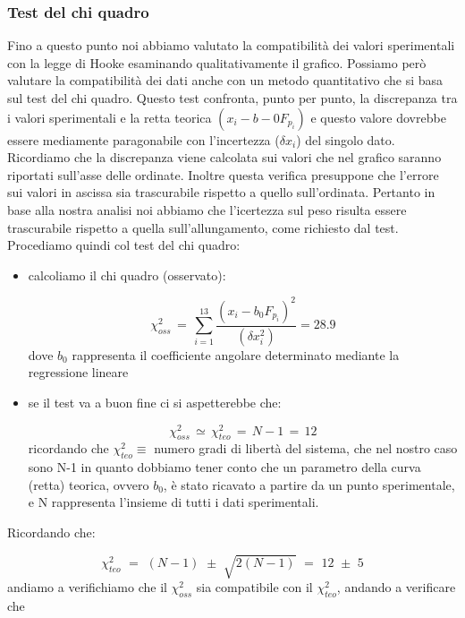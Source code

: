 \subsubsection{Test del chi quadro}
Fino a questo punto noi abbiamo valutato la compatibilità dei valori sperimentali con la legge di Hooke esaminando qualitativamente il grafico. Possiamo però valutare la compatibilità dei dati anche con un metodo quantitativo che si basa sul test del chi quadro. Questo test confronta, punto per punto, la discrepanza tra i valori sperimentali e la retta teorica
$(x_i - b-0 F_{p_i})$ e questo valore dovrebbe essere mediamente paragonabile con l'incertezza ($\delta x_i$) del singolo dato. Ricordiamo che la discrepanza viene calcolata sui valori che nel grafico saranno riportati sull'asse delle ordinate. Inoltre questa verifica presuppone che l'errore sui valori in ascissa sia trascurabile rispetto a quello sull'ordinata.
Pertanto in base alla nostra analisi noi abbiamo che l'icertezza sul peso risulta essere trascurabile rispetto  a quella sull'allungamento, come richiesto dal test.\\
Procediamo quindi col test del chi quadro:
\begin{itemize}
\item{calcoliamo il chi quadro (osservato):

	\begin{equation*}
		\chi_{oss}^2 \,=\, \sum_{i=1}^{13} \frac{(x_i - b_0 F_{p_i})^2}{(\delta x_i^2)} = 28.9
	\end{equation*}
	dove $b_0$ rappresenta il coefficiente angolare determinato mediante la regressione lineare}
\item{se il test va a buon fine ci si aspetterebbe che:

	\begin{equation*}
		\chi_{oss}^2 \, \simeq \, \chi_{teo}^2 \,=\, N - 1 \,=\, 12  
	\end{equation*}
	ricordando che $\chi_{teo}^2 \equiv$ numero gradi di libertà del sistema, che nel nostro caso sono N-1 in quanto dobbiamo tener conto che un parametro della curva (retta) teorica, ovvero $b_0$, è stato ricavato a partire da un punto sperimentale, e N rappresenta l'insieme di tutti i dati sperimentali.}
\end{itemize}
Ricordando che:

\begin{equation*}
	\chi_{teo}^2 \,\,=\,\, (N-1) \,\, \pm \,\, \sqrt{2(N-1)} \,\,=\,\, 12 \,\,\pm\,\, 5
\end{equation*}
%
andiamo a verifichiamo che il $\chi_{oss}^2$ sia compatibile con il $\chi_{teo}^2$, andando a verificare che

